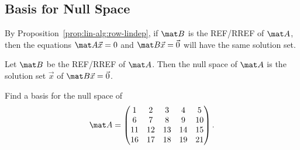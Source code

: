 \subsection{Basis for Null Space}

By Proposition~\ref{prop:lin-alg:row-lindep}, if $\mat B$ is the REF/RREF of $\mat A$, then the equations $\mat A \vec x = 0$ and $\mat B \vec x = \vec 0$ will have the same solution set. 

\begin{recipe}
    Let $\mat B$ be the REF/RREF of $\mat A$. Then the null space of $\mat A$ is the solution set $\vec x$ of $\mat B \vec x = \vec 0$.
\end{recipe}

\begin{sample}
    Find a basis for the null space of \[\mat A = \begin{pmatrix}1 & 2 & 3 & 4 & 5 \\ 6 & 7 & 8 & 9 & 10 \\ 11 & 12 & 13 & 14 & 15 \\ 16 & 17 & 18 & 19 & 21\end{pmatrix}.\]
\end{sample}
